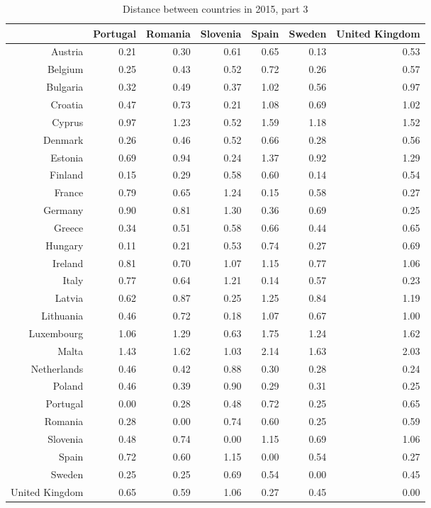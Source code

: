 \documentclass[a4paper,twoside,10pt]{article}
\begin{document}
	\begin{table}[ht]
		\footnotesize
		\centering
		
		\begin{tabular}{r|rrrrrr}
			\hline
			& Portugal & Romania & Slovenia & Spain & Sweden & United Kingdom \\
			\hline
			Austria & 0.21 & 0.30 & 0.61 & 0.65 & 0.13 & 0.53 \\
			Belgium & 0.25 & 0.43 & 0.52 & 0.72 & 0.26 & 0.57 \\
			Bulgaria & 0.32 & 0.49 & 0.37 & 1.02 & 0.56 & 0.97 \\
			Croatia & 0.47 & 0.73 & 0.21 & 1.08 & 0.69 & 1.02 \\
			Cyprus & 0.97 & 1.23 & 0.52 & 1.59 & 1.18 & 1.52 \\
			Denmark & 0.26 & 0.46 & 0.52 & 0.66 & 0.28 & 0.56 \\
			Estonia & 0.69 & 0.94 & 0.24 & 1.37 & 0.92 & 1.29 \\
			Finland & 0.15 & 0.29 & 0.58 & 0.60 & 0.14 & 0.54 \\
			France & 0.79 & 0.65 & 1.24 & 0.15 & 0.58 & 0.27 \\
			Germany & 0.90 & 0.81 & 1.30 & 0.36 & 0.69 & 0.25 \\
			Greece & 0.34 & 0.51 & 0.58 & 0.66 & 0.44 & 0.65 \\
			Hungary & 0.11 & 0.21 & 0.53 & 0.74 & 0.27 & 0.69 \\
			Ireland & 0.81 & 0.70 & 1.07 & 1.15 & 0.77 & 1.06 \\
			Italy & 0.77 & 0.64 & 1.21 & 0.14 & 0.57 & 0.23 \\
			Latvia & 0.62 & 0.87 & 0.25 & 1.25 & 0.84 & 1.19 \\
			Lithuania & 0.46 & 0.72 & 0.18 & 1.07 & 0.67 & 1.00 \\
			Luxembourg & 1.06 & 1.29 & 0.63 & 1.75 & 1.24 & 1.62 \\
			Malta & 1.43 & 1.62 & 1.03 & 2.14 & 1.63 & 2.03 \\
			Netherlands & 0.46 & 0.42 & 0.88 & 0.30 & 0.28 & 0.24 \\
			Poland & 0.46 & 0.39 & 0.90 & 0.29 & 0.31 & 0.25 \\
			Portugal & 0.00 & 0.28 & 0.48 & 0.72 & 0.25 & 0.65 \\
			Romania & 0.28 & 0.00 & 0.74 & 0.60 & 0.25 & 0.59 \\
			Slovenia & 0.48 & 0.74 & 0.00 & 1.15 & 0.69 & 1.06 \\
			Spain & 0.72 & 0.60 & 1.15 & 0.00 & 0.54 & 0.27 \\
			Sweden & 0.25 & 0.25 & 0.69 & 0.54 & 0.00 & 0.45 \\
			United Kingdom & 0.65 & 0.59 & 1.06 & 0.27 & 0.45 & 0.00 \\
			\hline
		\end{tabular}
		\caption{Distance between countries in 2015, part 3}
		\label{tab:distance_2015}
	\end{table}
	
\end{document}
